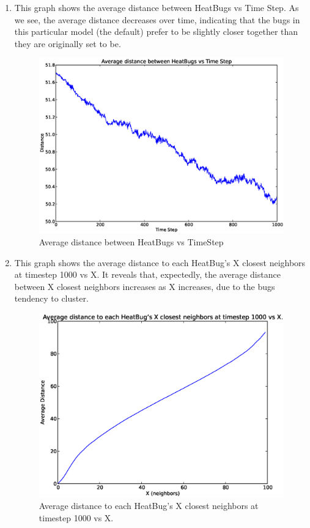 \documentclass{article}
\begin{document}
\begin{enumerate}

\item{} %

This graph shows the average distance between HeatBugs vs Time Step. As we see,
the average distance decreases over time, indicating that the bugs in this
particular model (the default) prefer to be slightly closer together than they
are originally set to be.

\begin{figure}[H]
\centering
\includegraphics[width=\textwidth]{figs/figure_1}
\caption{Average distance between HeatBugs vs TimeStep}
\end{figure}

\newpage

\item{} %

This graph shows the average distance to each HeatBug's X closest neighbors at
timestep 1000 vs X. It reveals that, expectedly, the average distance between X
closest neighbors increases as X increases, due to the bugs tendency to
cluster.

\begin{figure}[H]
\centering
\includegraphics[width=\textwidth]{figs/figure_2}
\caption{Average distance to each HeatBug's X closest neighbors at timestep 1000 vs X.}
\end{figure}


\end{enumerate}
\end{document}

